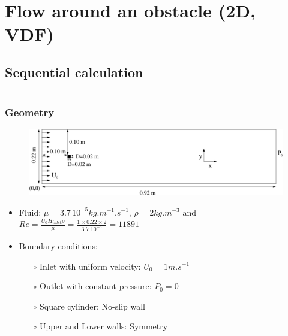 \documentclass[10pt, hyperref={unicode=true,pdfusetitle, bookmarks=true,bookmarksnumbered=false,bookmarksopen=false, breaklinks=false,pdfborder={0 0 1},backref=true,colorlinks=true,linkcolor=darkblue,pageanchor}]{beamer}
\begin{document}
\section{{\bf{Flow around an obstacle (2D, VDF)}}} \label{exo1}
\subsection{Sequential calculation}
\begin{frame}
\begin{small}
\begin{columns}[c] 
\tableofcontents[sections={1-9},currentsection, currentsubsection]
\tableofcontents[sections={10-16},currentsection, currentsubsection]
\end{columns}
\end{small}
\end{frame}
\begin{frame}
\frametitle{Geometry}
\begin{block}{}

\begin{figure}
\includegraphics[width=1\textwidth]{PICTURES/Obstacle.pdf}
\end{figure}

\begin{itemize}
\item Fluid: $\mu=3.7 \, 10^{-5} kg.m^{-1}.s^{-1}$, $\rho=2 kg.m^{-3}$ and $Re=\frac{U_0 H_{inlet} \rho}{\mu} = \frac{1 \times 0.22 \times 2}{3.7 \;10^{-5}} = 11 891$
\item Boundary conditions:\\
    \begin{itemize}
    \item [$\circ$] Inlet with uniform velocity: $U_0=1 m.s^{-1}$
    \item [$\circ$] Outlet with constant pressure: $P_0=0$
    \item [$\circ$] Square cylinder: No-slip wall
    \item [$\circ$] Upper and Lower walls: Symmetry
    \end{itemize}
\end{itemize}

\end{block}
\end{frame}
\end{document}
